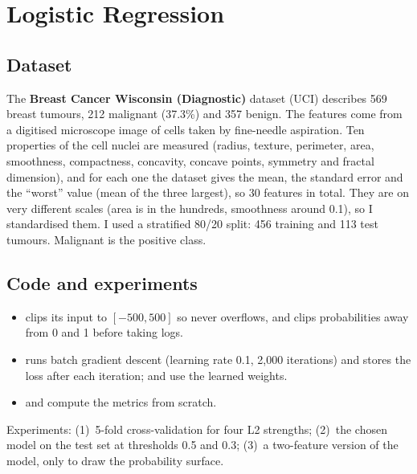 \chapter{Logistic Regression}


\section{Dataset}
The \textbf{Breast Cancer Wisconsin (Diagnostic)} dataset (UCI) describes 569 breast tumours, 212
malignant (37.3\%) and 357 benign. The features come from a digitised microscope image of cells taken by
fine-needle aspiration. Ten properties of the cell nuclei are measured (radius, texture, perimeter, area,
smoothness, compactness, concavity, concave points, symmetry and fractal dimension), and for each one the
dataset gives the mean, the standard error and the ``worst'' value (mean of the three largest), so 30
features in total. They are on very different scales (area is in the hundreds, smoothness around
0.1), so I standardised them. I used a stratified 80/20 split: 456 training and 113 test tumours.
Malignant is the positive class.

\section{Code and experiments}
\begin{itemize}
\item {} clips its input to $[-500,500]$ so  never overflows, and
       clips probabilities away from 0 and 1 before taking logs.
\item {} runs batch gradient descent (learning rate 0.1, 2,000 iterations)
      and stores the loss after each iteration;  and  use the
      learned weights.
\item {} and  compute the metrics from scratch.
\end{itemize}
\noindent Experiments: (1)~5-fold cross-validation for four L2 strengths; (2)~the chosen model on the
test set at thresholds 0.5 and 0.3; (3)~a two-feature version of the model, only to draw the probability
surface.


